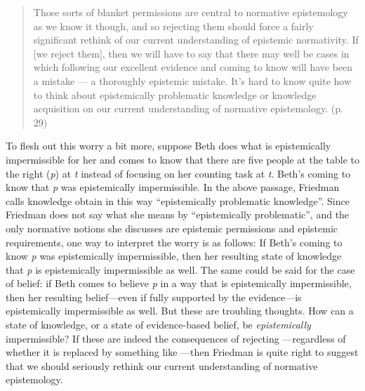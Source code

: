 \documentclass[12pt]{article}
\begin{document}
\begin{quote}
    Those sorts of blanket permissions are central to normative epistemology as we know it though, and so rejecting them should force a fairly significant rethink of our current understanding of epistemic normativity. If [we reject them], then we will have to say that there may well be cases in which following our excellent evidence and coming to know will have been a mistake — a thoroughly epistemic mistake. It’s hard to know quite how to think about epistemically problematic knowledge or knowledge acquisition on our current understanding of normative epistemology. (p. 29)
\end{quote}
%
To flesh out this worry a bit more, suppose Beth does what is epistemically impermissible for her and comes to know that there are five people at the table to the right (\textit{p}) at \textit{t} instead of focusing on her counting task at \textit{t}. Beth's coming to know that \textit{p} was epistemically impermissible. In the above passage, Friedman calls knowledge obtain in this way ``epistemically problematic knowledge''. Since Friedman does not say what she means by ``epistemically problematic'', and the only normative notions she discusses are epistemic permissions and epistemic requirements, one way to interpret the worry is as follows: If Beth's coming to know \textit{p} was epistemically impermissible, then her resulting state of knowledge that \textit{p} is epistemically impermissible as well. The same could be said for the case of belief: if Beth comes to believe \textit{p} in a way that is epistemically impermissible, then her resulting belief---even if fully supported by the evidence---is epistemically impermissible as well. But these are troubling thoughts. How can a state of knowledge, or a state of evidence-based belief, be \textit{epistemically} impermissible? If these are indeed the consequences of rejecting \ep{}---regardless of whether it is replaced by something like \epc{}---then Friedman is quite right to suggest that we should seriously rethink our current understanding of normative epistemology.
\end{document}

